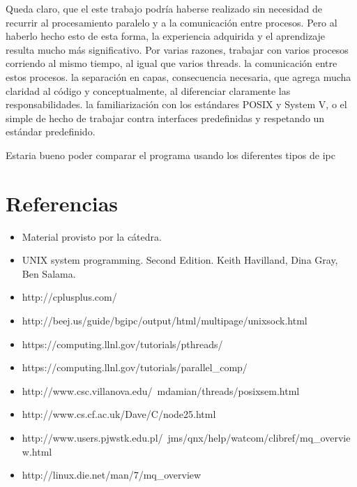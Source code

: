\documentclass[a4paper,10pt]{article}
\begin{document}
Queda claro, que el este trabajo podría haberse realizado sin necesidad de recurrir al procesamiento paralelo y a la comunicación entre procesos. Pero al haberlo hecho esto de esta forma,
la experiencia adquirida y el aprendizaje resulta mucho más significativo. Por varias razones,
trabajar con varios procesos corriendo al mismo tiempo, al igual que varios threads.
la comunicación entre estos procesos.
la separación en capas, consecuencia necesaria, que agrega mucha claridad al código y conceptualmente, al diferenciar claramente las responsabilidades.
la familiarización con los estándares POSIX y System V, o el simple de hecho de trabajar contra interfaces predefinidas y respetando un estándar predefinido.


Estaria bueno poder comparar el programa usando los diferentes tipos de ipc

\newpage     
\section{Referencias}

\begin{itemize}
  \item Material provisto por la cátedra.
  \item UNIX system programming. Second Edition. Keith Havilland, Dina Gray, Ben Salama.
  \item http://cplusplus.com/
  \item http://beej.us/guide/bgipc/output/html/multipage/unixsock.html
  \item https://computing.llnl.gov/tutorials/pthreads/
  \item https://computing.llnl.gov/tutorials/parallel\_comp/
  \item http://www.csc.villanova.edu/~mdamian/threads/posixsem.html
  \item http://www.cs.cf.ac.uk/Dave/C/node25.html
  \item http://www.users.pjwstk.edu.pl/~jms/qnx/help/watcom/clibref/mq\_overview.html
  \item http://linux.die.net/man/7/mq\_overview
\end{itemize}
   
\end{document}
